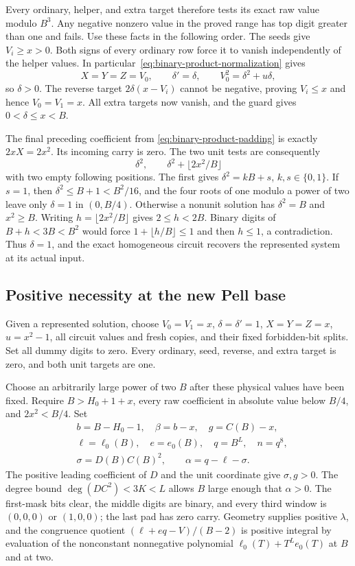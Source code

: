 Every ordinary, helper, and extra target therefore tests its exact
raw value modulo $B^3$. Any negative nonzero value in the proved
range has top digit greater than one and fails. Use these facts in
the following order. The seeds give $V_i\ge x>0$. Both signs of
every ordinary row force it to vanish independently of the helper
values. In particular~\eqref{eq:binary-product-normalization} gives
\[
 X=Y=Z=V_0,\qquad \delta'=\delta,\qquad
 V_0^2=\delta^2+u\delta,
\]
so $\delta>0$. The reverse target $2\delta(x-V_i)$ cannot be
negative, proving $V_i\le x$ and hence $V_0=V_1=x$. All extra
targets now vanish, and the guard gives $0<\delta\le x<B$.

The final preceding coefficient from
\eqref{eq:binary-product-padding} is exactly $2xX=2x^2$. Its
incoming carry is zero. The two unit tests are consequently
\[
 \delta^2,\qquad \delta^2+\lfloor2x^2/B\rfloor
\]
with two empty following positions. The first gives
$\delta^2=kB+s$, $k,s\in\{0,1\}$. If $s=1$, then
$\delta^2\le B+1<B^2/16$, and the four roots of one modulo a
power of two leave only $\delta=1$ in $(0,B/4)$. Otherwise a
nonunit solution has $\delta^2=B$ and $x^2\ge B$.
Writing $h=\lfloor2x^2/B\rfloor$ gives $2\le h<2B$. Binary digits
of $B+h<3B<B^2$ would force
$1+\lfloor h/B\rfloor\le1$ and then $h\le1$, a contradiction.
Thus $\delta=1$, and the exact homogeneous circuit recovers the
represented system at its actual input.

\subsection{Positive necessity at the new Pell base}

Given a represented solution, choose $V_0=V_1=x$,
$\delta=\delta'=1$, $X=Y=Z=x$, $u=x^2-1$, all circuit values and
fresh copies, and their fixed forbidden-bit splits. Set all dummy
digits to zero. Every ordinary, seed, reverse, and extra target is
zero, and both unit targets are one.

Choose an arbitrarily large power of two $B$ after these physical
values have been fixed. Require $B>H_0+1+x$, every raw coefficient
in absolute value below $B/4$, and $2x^2<B/4$. Set
\begin{equation}\label{eq:binary-product-necessary-coding}
\begin{aligned}
 &b=B-H_0-1,\quad \beta=b-x,\quad g=C(B)-x,\\
 &\ell=\ell_0(B),\quad e=e_0(B),\quad q=B^L,\quad n=q^8,\\
 &\sigma=D(B)C(B)^2,\qquad \alpha=q-\ell-\sigma.
\end{aligned}
\end{equation}
The positive leading coefficient of $D$ and the unit coordinate give
$\sigma,g>0$. The degree bound $\deg(DC^2)<3K<L$ allows $B$ large
enough that $\alpha>0$. The first-mask bits clear, the middle digits
are binary, and every third window is $(0,0,0)$ or $(1,0,0)$; the
last pad has zero carry. Geometry supplies positive $\lambda$, and
the congruence quotient $(\ell+eq-V)/(B-2)$ is positive integral by
evaluation of the nonconstant nonnegative polynomial
$\ell_0(T)+T^Le_0(T)$ at $B$ and at two.

